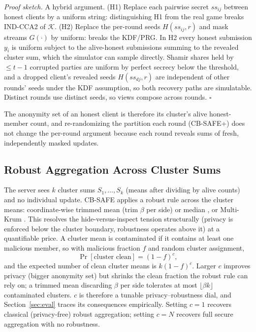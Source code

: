 \documentclass[conference]{IEEEtran}
\begin{document}
\emph{Proof sketch.} A hybrid argument. (H1) Replace each pairwise secret $ss_{ij}$
between honest clients by a uniform string: distinguishing H1 from the real game
breaks IND-CCA2 of $\mathcal{K}$. (H2) Replace the per-round seeds $H(ss_{ij},r)$
and mask streams $G(\cdot)$ by uniform: breaks the KDF/PRG. In H2 every honest
submission $y_i$ is uniform subject to the alive-honest submissions summing to the
revealed cluster sum, which the simulator can sample directly. Shamir shares held by
$\le t-1$ corrupted parties are uniform by perfect secrecy below the threshold, and
a dropped client's revealed seeds $H(ss_{dj}, r)$ are independent of other rounds'
seeds under the KDF assumption, so both recovery paths are simulatable. Distinct
rounds use distinct seeds, so views compose across rounds. \hfill$\square$

The anonymity set of an honest client is therefore its cluster's alive honest-member
count, and re-randomizing the partition each round (CB-SAFE+) does not change the
per-round argument because each round reveals sums of fresh, independently masked
updates.

\subsection{Robust Aggregation Across Cluster Sums}\label{sec:tradeoff}
The server sees $k$ cluster sums $S_1,\dots,S_k$ (means after dividing by alive
counts) and no individual update. CB-SAFE applies a robust rule across the cluster
means: coordinate-wise trimmed mean (trim $\beta$ per side) or median \cite{yin2018},
or Multi-Krum \cite{blanchard2017}. This resolves the hide-versus-inspect tension structurally (privacy
is enforced below the cluster boundary, robustness operates above it) at a
quantifiable price. A cluster mean is contaminated if it contains at least one
malicious member, so with malicious fraction $f$ and random cluster assignment,
\[
\Pr[\text{cluster clean}] = (1-f)^{c},
\]
and the expected number of clean cluster means is $k(1-f)^c$. Larger $c$ improves
privacy (bigger anonymity set) but shrinks the clean fraction the robust rule can
rely on; a trimmed mean discarding $\beta$ per side tolerates at most
$\lfloor \beta k \rfloor$ contaminated clusters. $c$ is therefore a tunable
privacy--robustness dial, and Section~\ref{sec:eval} traces its consequences
empirically. Setting $c{=}1$ recovers classical (privacy-free) robust aggregation;
setting $c{=}N$ recovers full secure aggregation with no robustness.
\end{document}
